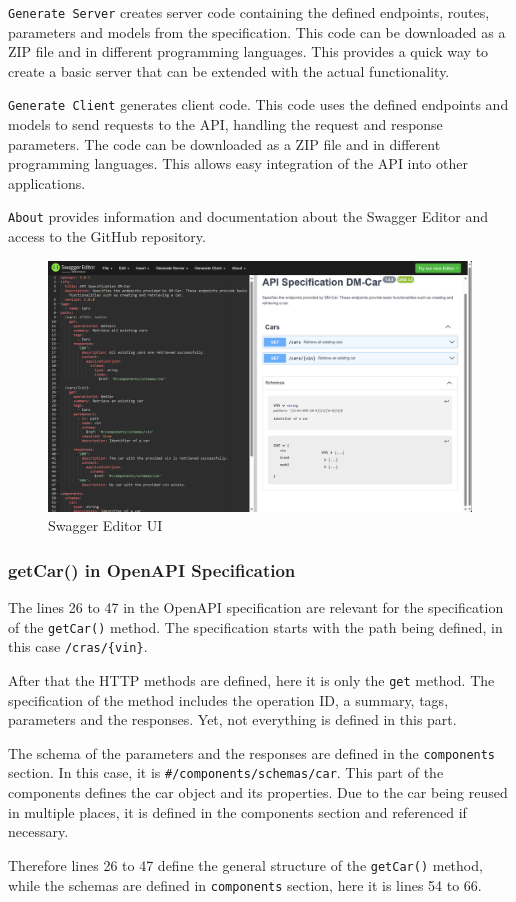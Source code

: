 \texttt{Generate Server} creates server code containing the defined endpoints, routes, parameters and models from the specification.
This code can be downloaded as a ZIP file and in different programming languages.
This provides a quick way to create a basic server that can be extended with the actual functionality.

\texttt{Generate Client} generates client code.
This code uses the defined endpoints and models to send requests to the API, handling the request and response parameters.
The code can be downloaded as a ZIP file and in different programming languages.
This allows easy integration of the API into other applications.

\texttt{About} provides information and documentation about the Swagger Editor and access to the GitHub repository.

\begin{figure}
    \centering
    \includegraphics[width=\textwidth]{figures/microservices/dmCar/ms_dmCar_swaggerEditorUI.png}
    \caption{Swagger Editor UI}
    \label{fig:ms_dmCar_swaggerEditorUI}
\end{figure}

\subsubsection*{getCar() in OpenAPI Specification}
The lines 26 to 47 in the OpenAPI specification are relevant for the specification of the \texttt{getCar()} method.
The specification starts with the path being defined, in this case \texttt{/cras/\{vin\}}.

After that the HTTP methods are defined, here it is only the \texttt{get} method.
The specification of the method includes the operation ID, a summary, tags, parameters and the responses.
Yet, not everything is defined in this part.

The schema of the parameters and the responses are defined in the \texttt{components} section.
In this case, it is \texttt{\#/components/schemas/car}.
This part of the components defines the car object and its properties.
Due to the car being reused in multiple places, it is defined in the components section and referenced if necessary.

Therefore lines 26 to 47 define the general structure of the \texttt{getCar()} method, while the schemas are defined in \texttt{components} section, here it is lines 54 to 66.